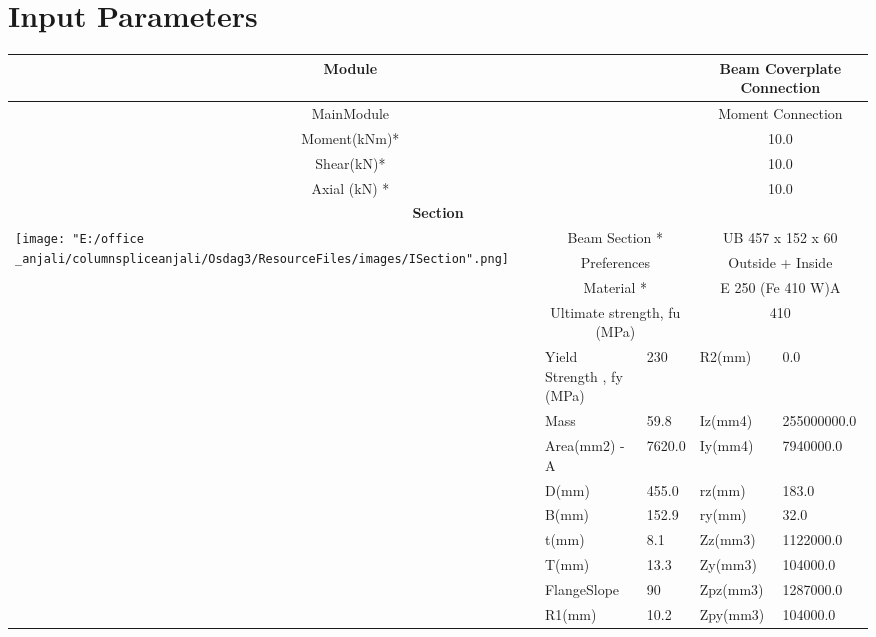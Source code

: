 \documentclass{article}%
\begin{document}
%
\normalsize%
\pagestyle{header}%
\section{Input Parameters}%
\label{sec:InputParameters}%
\renewcommand{\arraystretch}{1.2}%
\begin{longtable}{|p{5cm}|p{2cm}|p{2cm}|p{2cm}|p{5cm}|}%
\hline%
\hline%
\multicolumn{3}{|c|}{Module}&\multicolumn{2}{|c|}{Beam Coverplate Connection}\\%
\hline%
\hline%
\multicolumn{3}{|c|}{MainModule}&\multicolumn{2}{|c|}{Moment Connection}\\%
\hline%
\hline%
\multicolumn{3}{|c|}{Moment(kNm)*}&\multicolumn{2}{|c|}{10.0}\\%
\hline%
\hline%
\multicolumn{3}{|c|}{Shear(kN)*}&\multicolumn{2}{|c|}{10.0}\\%
\hline%
\hline%
\multicolumn{3}{|c|}{Axial (kN) *}&\multicolumn{2}{|c|}{10.0}\\%
\hline%
\hline%
\multicolumn{5}{|c|}{\textbf{Section}}\\%
\hline%
\hline%
\multirow{13}{*}{\texttt{[image: "E:/office \_anjali/columnspliceanjali/Osdag3/ResourceFiles/images/ISection".png]}}&\multicolumn{2}{|c|}{Beam Section *}&\multicolumn{2}{|c|}{UB 457 x 152 x 60}\\%
\cline{2%
-%
5}%
&\multicolumn{2}{|c|}{Preferences}&\multicolumn{2}{|c|}{Outside + Inside}\\%
\cline{2%
-%
5}%
&\multicolumn{2}{|c|}{Material *}&\multicolumn{2}{|c|}{E 250 (Fe 410 W)A}\\%
\cline{2%
-%
5}%
&\multicolumn{2}{|c|}{Ultimate strength, fu (MPa)}&\multicolumn{2}{|c|}{410}\\%
\cline{2%
-%
5}%
&Yield Strength , fy (MPa)&230&R2(mm)&0.0\\%
\cline{2%
-%
5}%
&Mass&59.8&Iz(mm4)&255000000.0\\%
\cline{2%
-%
5}%
&Area(mm2) {-} A&7620.0&Iy(mm4)&7940000.0\\%
\cline{2%
-%
5}%
&D(mm)&455.0&rz(mm)&183.0\\%
\cline{2%
-%
5}%
&B(mm)&152.9&ry(mm)&32.0\\%
\cline{2%
-%
5}%
&t(mm)&8.1&Zz(mm3)&1122000.0\\%
\cline{2%
-%
5}%
&T(mm)&13.3&Zy(mm3)&104000.0\\%
\cline{2%
-%
5}%
&FlangeSlope&90&Zpz(mm3)&1287000.0\\%
\cline{2%
-%
5}%
&R1(mm)&10.2&Zpy(mm3)&104000.0\\%

\end{longtable}
\end{document}
